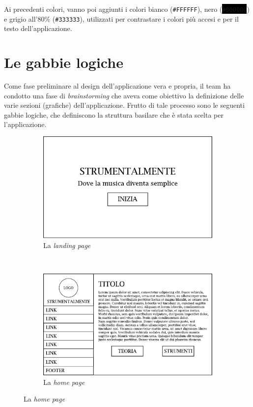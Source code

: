 Ai precedenti colori, vanno poi aggiunti i colori bianco (\colorbox[HTML]{FFFFFF}{\texttt{\#FFFFFF}}), nero (\colorbox{black}{\color{white}\texttt{\#000000}}) e grigio all'80\% (\colorbox[HTML]{333333}{\color{white}\texttt{\#333333}}), utilizzati per contrastare i colori più accesi e per il testo dell'applicazione.

\section{Le gabbie logiche}

Come fase preliminare al design dell'applicazione vera e propria, il team ha condotto una fase di \emph{brainstorming} che aveva come obiettivo la definizione delle varie sezioni (grafiche) dell'applicazione. Frutto di tale processo sono le seguenti gabbie logiche, che definiscono la struttura basilare che è stata scelta per l'applicazione.
\clearpage
\vspace*{\fill}
\begin{figure}[H]
	\centering
	\label{fig:gabbie-logiche}
	\caption{Le gabbie logiche di \ProjectTitle{}}
	\begin{subfigure}[t]{\textwidth}
		\centering
		\includegraphics[width=\textwidth]{gabbie_logiche/Landing_Page}
		\caption{La \emph{landing page}}
	\end{subfigure}
	~\vskip40pt
	\begin{subfigure}[t]{\textwidth}
		\centering
		\includegraphics[width=\textwidth]{gabbie_logiche/Home}
		\caption{La \emph{home page}}
	\end{subfigure}
\end{figure}

